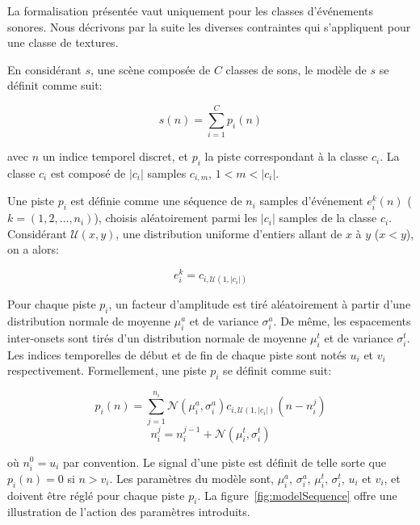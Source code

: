 La formalisation présentée vaut uniquement pour les classes d'événements sonores. Nous décrivons par la suite les diverses contraintes qui s'appliquent pour une classe de textures.
 
En considérant $s$, une scène composée de $C$ classes de sons, le modèle de $s$ se définit  comme suit:
 
 \begin{equation}
 s(n)=\sum_{i=1}^{C}p_i(n)
 \end{equation}

avec $n$ un indice temporel discret, et $p_i$ la piste correspondant à la classe $c_i$. La classe $c_i$ est composé de $\vert c_i\vert$ samples $c_{i,m}$, $1<m<\vert c_i\vert$. 

Une piste $p_i$ est définie comme une séquence de $n_i$ samples d'événement $e^k_i(n)$ ($k=(1,2,\ldots,n_i)$), choisis aléatoirement parmi les $\vert c_i\vert$ samples de la classe $c_i$. Considérant $\mathcal{U}(x,y)$, une distribution uniforme d'entiers allant de $x$ à $y$ ($x<y$), on a alors:

 \begin{equation}
 e^k_i=c_{i,\mathcal{U}(1,\vert c_i \vert)}
 \end{equation}

 Pour chaque piste $p_i$, un facteur d'amplitude est tiré aléatoirement à partir d'une distribution normale de moyenne $\mu^a_i$ et de variance $\sigma^a_i$. De même, les espacements inter-onsets sont tirés d'un distribution normale de moyenne $\mu^t_i$ et de variance $\sigma^t_i$. Les indices temporelles de début et de fin de chaque piste sont notés $u_i$ et $v_i$ respectivement. Formellement, une piste $p_i$ se définit comme suit:
 
\begin{equation}
\label{eq1}
p_{i}(n)= \sum_{j=1}^{n_i} \mathcal{N}(\mu^a_{i},\sigma^a_{i})c_{i, \mathcal{U} (1, |c_i|)}(n-n^j_i)
\end{equation}
\begin{equation}
\label{eq2}
n_i^j=n_i^{j-1} + \mathcal{N}({\mu^t_{i},\sigma^t_{i}})
\end{equation}

où $n_i^0=u_i$ par convention. Le signal d'une piste est définit de telle sorte que $p_i(n)=0$ si $n>v_i$. Les paramètres du modèle sont, $\mu^a_i$,  $\sigma^a_i$,   $\mu^t_i$,  $\sigma^t_i$, $u_i$ et $v_i$, et doivent être réglé pour chaque piste $p_i$. La figure~\ref{fig:modelSequence} offre une illustration de l'action des paramètres introduits.


